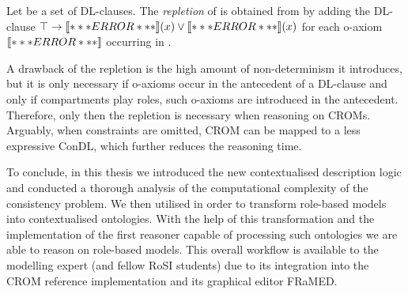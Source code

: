 \documentclass[final]{scrartcl}
\begin{document}
\begin{definition}
  Let \Cmc be a set of DL-clauses. The \emph{repletion} of \Cmc is obtained from \Cmc by adding the
  DL-clause $\top \to \mathord{\left\llbracket***ERROR***\right\rrbracket}(x) \lor \mathord{\left\llbracket***ERROR***\right\rrbracket}(x)$ for each o-axiom $\mathord{\left\llbracket***ERROR***\right\rrbracket}$
  occurring in \Cmc.
\end{definition}

A drawback of the repletion is the high amount of non-determinism it introduces, but it is only
necessary if o-axioms occur in the antecedent of a DL-clause and only if compartments play roles,
such o-axioms are introduced in the antecedent. Therefore, only then the repletion is necessary when
reasoning on CROMs. Arguably, when constraints are omitted, CROM can be mapped to a less expressive
ConDL, which further reduces the reasoning time.


To conclude, in this thesis we introduced the new contextualised description logic \LMLO and
conducted a thorough analysis of the computational complexity of the consistency problem. We then
utilised \LMLO in order to transform role-based models into contextualised ontologies. With the help
of this transformation and the implementation of the first reasoner capable of processing such
ontologies we are able to reason on role-based models. This overall workflow is available to the
modelling expert (and fellow RoSI students) due to its integration into the CROM reference
implementation and its graphical editor FRaMED.


\sloppy
\printbibliography
\end{document}
